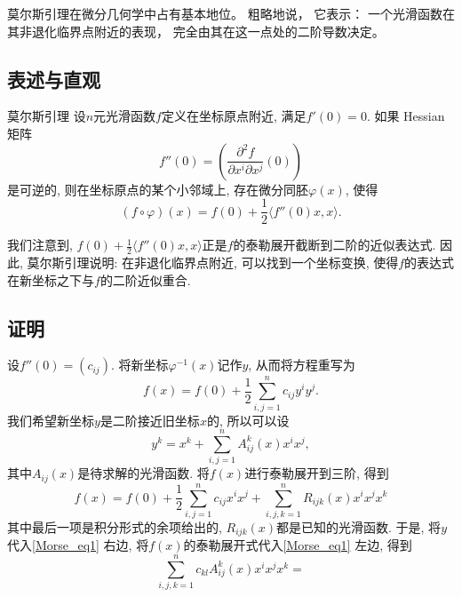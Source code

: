
\begin{issues}
\issueTODO
\issueDraft
\end{issues}


莫尔斯引理在微分几何学中占有基本地位。 粗略地说， 它表示： 一个光滑函数在其非退化临界点附近的表现， 完全由其在这一点处的二阶导数决定。

\subsection{表述与直观}
\begin{lemma}{莫尔斯引理}
设$n$元光滑函数$f$定义在坐标原点附近, 满足$f'(0)=0$. 如果 Hessian 矩阵
$$
f''(0)=\left(\frac{\partial^2f}{\partial x^i\partial x^j}(0)\right)
$$
是可逆的, 则在坐标原点的某个小邻域上, 存在微分同胚$\varphi(x)$, 使得
$$
(f\circ\varphi)(x)=f(0)+\frac{1}{2}\langle f''(0)x,x\rangle.
$$
\end{lemma}

我们注意到, $f(0)+\frac{1}{2}\langle f''(0)x,x\rangle$正是$f$的泰勒展开截断到二阶的近似表达式. 因此, 莫尔斯引理说明: 在非退化临界点附近, 可以找到一个坐标变换, 使得$f$的表达式在新坐标之下与$f$的二阶近似重合.

\subsection{证明}
设$f''(0)=(c_{ij})$. 将新坐标$\varphi^{-1}(x)$记作$y$, 从而将方程重写为
\begin{equation}\label{Morse_eq1}
f(x)=f(0)+\frac{1}{2}\sum_{i,j=1}^nc_{ij}y^iy^j.
\end{equation}
我们希望新坐标$y$是二阶接近旧坐标$x$的, 所以可以设
$$
y^k
=x^k+\sum_{i,j=1}^nA^k_{ij}(x)x^ix^j,
$$
其中$A_{ij}(x)$是待求解的光滑函数. 将$f(x)$进行泰勒展开到三阶, 得到
$$
f(x)=f(0)+\frac{1}{2}\sum_{i,j=1}^nc_{ij}x^ix^j+
\sum_{i,j,k=1}^nR_{ijk}(x)x^ix^jx^k
$$
其中最后一项是积分形式的余项给出的, $R_{ijk}(x)$都是已知的光滑函数. 于是, 将$y$代入\autoref{Morse_eq1} 右边, 将$f(x)$的泰勒展开式代入\autoref{Morse_eq1} 左边, 得到
$$
\sum_{i,j,k=1}^nc_{kl}A^k_{ij}(x)x^ix^jx^k
=
$$
